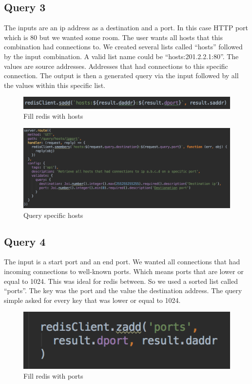 \subsection{Query 3}
The inputs are an ip address as a destination and a port. In this case HTTP port which is 80 but we wanted some room. The user wants all hosts that this combination had connections to. We created several lists called “hosts” followed by the input combination. A valid list name could be “hosts:201.2.2.1:80”. The values are source addresses. Addresses that had connections to this specific connection. The output is then a generated query via the input followed by all the values within this specific list.

  \begin{figure}[htb!]
	\centerline{\includegraphics[width=1.0\textwidth]{resources/solution2-6.png}}
	\caption{Fill redis with hosts}
	\label{query3}
\end{figure}

\begin{figure}[htb!]
	\centerline{\includegraphics[width=1.0\textwidth]{resources/solution2-7.png}}
	\caption{Query specific hosts}
	\label{query33}
\end{figure}

\subsection{Query 4}
The input is a start port and an end port. We wanted all connections that had incoming connections to well-known ports. Which means ports that are lower or equal to 1024. This was ideal for redis between. So we used a sorted list called “ports”. The key was the port and the value the destination address. The query simple asked for every key that was lower or equal to 1024.

  \begin{figure}[htb!]
	\centerline{\includegraphics[width=1.0\textwidth]{resources/solution2-8.png}}
	\caption{Fill redis with ports}
	\label{query4}
\end{figure}

